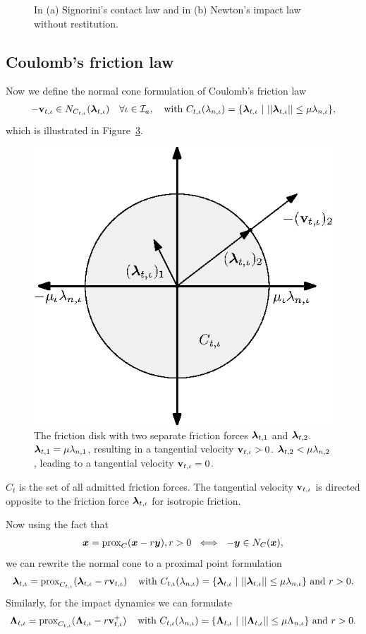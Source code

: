 \documentclass[../DC2019003Bouma.tex]{subfiles}
\begin{document}
\begin{figure}[bt!]
\begin{subfigure}{0.3\textwidth}
\caption{}\label{fig:appnewtonimpact}
\end{subfigure}
\caption{In \textnormal{(a)} Signorini's contact law and in \textnormal{(b)} Newton's impact law without restitution.}
\end{figure}

\subsection{Coulomb's friction law}
Now we define the normal cone formulation of Coulomb's friction law
\begin{align}
-\mathbf{v}_{t,\iota} \in N_{C_{t,\iota}}(\boldsymbol{\lambda}_{t,\iota})\quad \forall \iota\in\mathcal{I}_a,\quad \text{with }C_{t,\iota}(\lambda_{n,\iota}) = \{\boldsymbol{\lambda}_{t,\iota}\ |\ ||\boldsymbol{\lambda}_{t,\iota}|| \leq \mu\lambda_{n,\iota}\},
\end{align}
which is illustrated in Figure~\ref{fig:appfrictiondisk}.  

\begin{figure}[h]
\centering
\includegraphics[width=.4\textwidth]{frictiondisk.eps}\caption{The friction disk with two separate friction forces $\boldsymbol{\lambda}_{t,1}$ and $\boldsymbol{\lambda}_{t,2}$. $\boldsymbol{\lambda}_{t,1} = \mu\lambda_{n,1}$, resulting in a tangential velocity $\mathbf{v}_{t,\iota}>0$. $\boldsymbol{\lambda}_{t,2}<\mu\lambda_{n,2}$, leading to a tangential velocity $\mathbf{v}_{t,\iota}=0$.}\label{fig:appfrictiondisk}
\end{figure}

$C_t$ is the set of all admitted friction forces. The tangential velocity $\mathbf{v}_{t,\iota}$ is directed opposite to the friction force $\boldsymbol{\lambda}_{t,\iota}$ for isotropic friction. 

Now using the fact that
\begin{align}
{\boldsymbol{x}} = \operatorname{\text{prox}}_C({\boldsymbol{x}} -r{\boldsymbol{y}}), r > 0\ \iff\ -{\boldsymbol{y}}\in N_C({\boldsymbol{x}}),
\end{align}
we can rewrite the normal cone to a proximal point formulation
\begin{align}
\boldsymbol{\lambda}_{t,\iota} = \operatorname{\text{prox}}_{C_{t,\iota}}(\boldsymbol{\lambda}_{t,\iota} - r\mathbf{v}_{t,\iota})\,\quad\text{with }C_{t,\iota}(\lambda_{n,\iota}) = \{\boldsymbol{\lambda}_{t,\iota}\ |\ ||\boldsymbol{\lambda}_{t,\iota}|| \leq \mu\lambda_{n,\iota}\}\text{ and }r>0.
\end{align}
Similarly, for the impact dynamics we can formulate
\begin{align}
\boldsymbol{\Lambda}_{t,\iota} = \operatorname{\text{prox}}_{C_{t,\iota}}(\boldsymbol{\Lambda}_{t,\iota} - r\mathbf{v}^+_{t,\iota})\,\quad \text{with }C_{t,\iota}(\lambda_{n,\iota}) = \{\boldsymbol{\Lambda}_{t,\iota}\ |\ ||\boldsymbol{\Lambda}_{t,\iota}|| \leq \mu\Lambda_{n,\iota}\}\text{ and }r>0.
\end{align}
\end{document}
